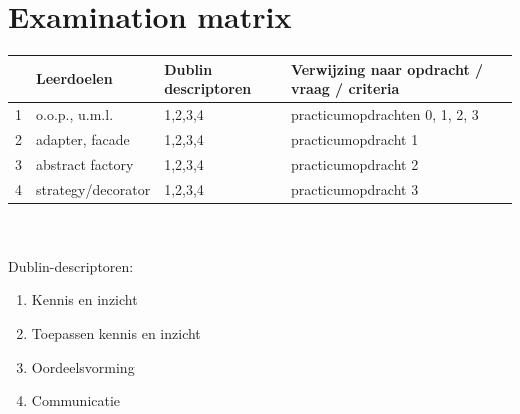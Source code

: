 \documentclass[titlepage,a4paper, 11pt]{article}
\begin{document}
\section{Examination matrix}
\begin{tabular}{|p{1cm}|p{4cm}|p{4cm}|p{4cm}|}
\hline
&Leerdoelen&Dublin descriptoren&Verwijzing naar opdracht / vraag / criteria\\
\hline
1&o.o.p., u.m.l.&1,2,3,4&practicumopdrachten 0, 1, 2, 3 \\
\hline
2&adapter, facade&1,2,3,4&practicumopdracht 1 \\
\hline
3&abstract factory&1,2,3,4&practicumopdracht 2 \\
\hline
4&strategy/decorator&1,2,3,4&practicumopdracht 3 \\
\hline
\end{tabular}\\
\vspace{1cm}\\
Dublin-descriptoren:
\begin{enumerate}
\item Kennis en inzicht
\item Toepassen kennis en inzicht
\item Oordeelsvorming
\item Communicatie
\end{enumerate}
\newpage
\end{document}
